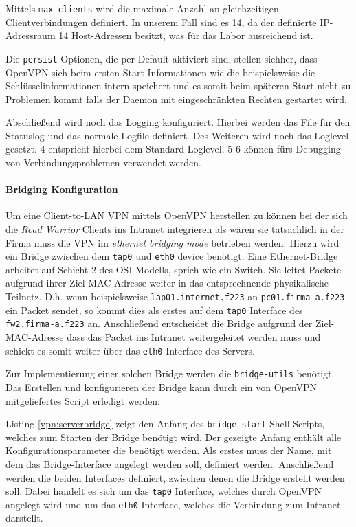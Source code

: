 Mittels \texttt{max-clients} wird die maximale Anzahl an gleichzeitigen Clientverbindungen definiert. In unserem Fall sind es 14, da der definierte IP-Adressraum 14 Host-Adressen besitzt, was für das Labor ausreichend ist.

Die \texttt{persist} Optionen, die per Default aktiviert sind, stellen sichher, dass OpenVPN sich beim ersten Start Informationen wie die beispielsweise die Schlüsselinformationen intern speichert und es somit beim späteren Start nicht zu Problemen kommt falls der Daemon mit eingeschränkten Rechten gestartet wird.

Abschließend wird noch das Logging konfiguriert. Hierbei werden das File für den Statuslog und das normale Logfile definiert. Des Weiteren wird noch das Loglevel gesetzt. 4 entspricht hierbei dem Standard Loglevel. 5-6 können fürs Debugging von Verbindungsproblemen verwendet werden.

\paragraph{Bridging Konfiguration}

Um eine Client-to-LAN VPN mittels OpenVPN herstellen zu können bei der sich die \emph{Road Warrior} Clients ins Intranet integrieren als wären sie tatsächlich in der Firma muss die VPN im \emph{ethernet bridging mode} betrieben werden. Hierzu wird ein Bridge zwischen dem \texttt{tap0} und \texttt{eth0} device benötigt. Eine Ethernet-Bridge arbeitet auf Schicht 2 des OSI-Modells, sprich wie ein Switch. Sie leitet Packete aufgrund ihrer Ziel-MAC Adresse weiter in das entsprechnende physikalische Teilnetz. D.h. wenn beispielsweise \texttt{lap01.internet.f223} an \texttt{pc01.firma-a.f223} ein Packet sendet, so kommt dies als erstes auf dem \texttt{tap0} Interface des \texttt{fw2.firma-a.f223} an. Anschließend entscheidet die Bridge aufgrund der Ziel-MAC-Adresse dass das Packet ins Intranet weitergeleitet werden muss und schickt es somit weiter über das \texttt{eth0} Interface des Servers.

Zur Implementierung einer solchen Bridge werden die \texttt{bridge-utils} benötigt. Das Erstellen und konfigurieren der Bridge kann durch ein von OpenVPN mitgeliefertes Script erledigt werden.



Listing \ref{vpn:serverbridge} zeigt den Anfang des \texttt{bridge-start} Shell-Scripts, welches zum Starten der Bridge benötigt wird. Der gezeigte Anfang enthält alle Konfigurationsparameter die benötigt werden. 
Als erstes muss der Name, mit dem das Bridge-Interface angelegt werden soll, definiert werden. Anschließend werden die beiden Interfaces definiert, zwischen denen die Bridge erstellt werden soll. Dabei handelt es sich um das \texttt{tap0} Interface, welches durch OpenVPN angelegt wird und um das \texttt{eth0} Interface, welches die Verbindung zum Intranet darstellt.

